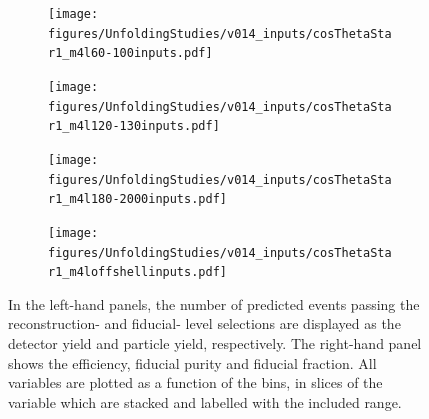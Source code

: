 \FloatBarrier
\clearpage

\begin{figure}[htb]
    \centering 
    \begin{subfigure}{.99\textwidth}\centering
        \texttt{[image: figures/UnfoldingStudies/v014\_inputs/cosThetaStar1\_m4l60-100inputs.pdf]}
    \end{subfigure}
    \begin{subfigure}{.99\textwidth}\centering
        \texttt{[image: figures/UnfoldingStudies/v014\_inputs/cosThetaStar1\_m4l120-130inputs.pdf]}
    \end{subfigure}
    \begin{subfigure}{.99\textwidth}\centering
        \texttt{[image: figures/UnfoldingStudies/v014\_inputs/cosThetaStar1\_m4l180-2000inputs.pdf]}
    \end{subfigure}
    \begin{subfigure}{.99\textwidth}\centering
        \texttt{[image: figures/UnfoldingStudies/v014\_inputs/cosThetaStar1\_m4loffshellinputs.pdf]}
    \end{subfigure}
    \caption{In the left-hand panels, the number of predicted events passing the reconstruction- and fiducial- level selections are displayed as the detector yield and particle yield, respectively. The right-hand panel shows the efficiency, fiducial purity and fiducial fraction. All variables are plotted as a function of the \costhetastar bins, in slices of the \mFourL variable which are stacked and labelled with the included \mFourL range.
    \label{fig:costhet1unf}}
\end{figure}  

\FloatBarrier
\clearpage

